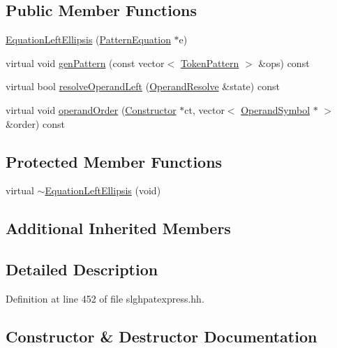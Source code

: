 \subsection*{Public Member Functions}
\begin{DoxyCompactItemize}
\item 
\mbox{\hyperlink{class_equation_left_ellipsis_a2c1fa90dcbd3861542b0bb7374262fa4}{Equation\+Left\+Ellipsis}} (\mbox{\hyperlink{class_pattern_equation}{Pattern\+Equation}} $\ast$e)
\item 
virtual void \mbox{\hyperlink{class_equation_left_ellipsis_a8d2e9982b85b000ff611204134a01061}{gen\+Pattern}} (const vector$<$ \mbox{\hyperlink{class_token_pattern}{Token\+Pattern}} $>$ \&ops) const
\item 
virtual bool \mbox{\hyperlink{class_equation_left_ellipsis_a91c58188530288eff1690528aff67c72}{resolve\+Operand\+Left}} (\mbox{\hyperlink{struct_operand_resolve}{Operand\+Resolve}} \&state) const
\item 
virtual void \mbox{\hyperlink{class_equation_left_ellipsis_a661203e5beadef3033ac3112353e012b}{operand\+Order}} (\mbox{\hyperlink{class_constructor}{Constructor}} $\ast$ct, vector$<$ \mbox{\hyperlink{class_operand_symbol}{Operand\+Symbol}} $\ast$ $>$ \&order) const
\end{DoxyCompactItemize}
\subsection*{Protected Member Functions}
\begin{DoxyCompactItemize}
\item 
virtual \mbox{\hyperlink{class_equation_left_ellipsis_a98ecd40683b957056b093e24540b167d}{$\sim$\+Equation\+Left\+Ellipsis}} (void)
\end{DoxyCompactItemize}
\subsection*{Additional Inherited Members}


\subsection{Detailed Description}


Definition at line 452 of file slghpatexpress.\+hh.



\subsection{Constructor \& Destructor Documentation}
\mbox{\label{class_equation_left_ellipsis_a98ecd40683b957056b093e24540b167d}} 
